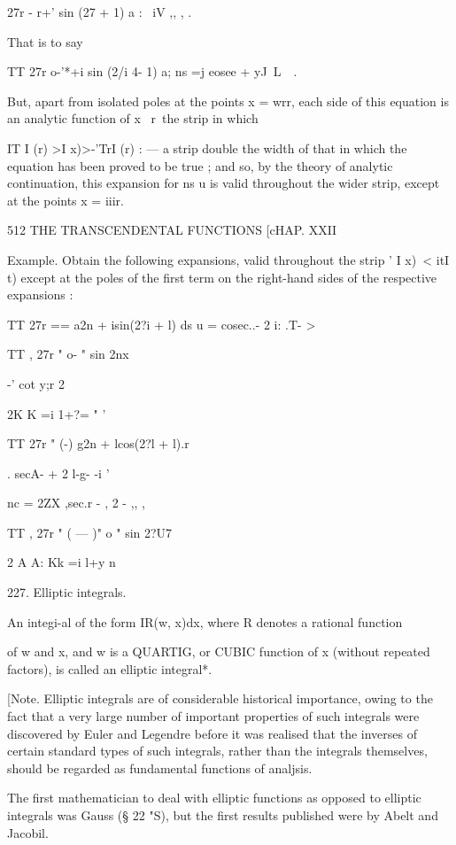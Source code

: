   27r - r+' sin (27 + 1) a : \ iV ,, , .

That is to say

TT 27r o-'*+i sin (2/i 4- 1) a; ns =j eosee + yJ\ L\ \ .

But, apart from isolated poles at the points x = wrr, each side of
this equation is an analytic function of x \ r\ the strip in which

IT I (r) >I x)>-'TrI (r) : — a strip double the width of that in which
the equation has been proved to be true ; and so, by the theory of
analytic continuation, this expansion for ns u is valid throughout the
wider strip, except at the points x = iiir.



512 THE TRANSCENDENTAL FUNCTIONS [cHAP. XXII

Example. Obtain the following expansions, valid throughout the strip '
I x)\ < itI t) except at the poles of the first term on the right-hand
sides of the respective expansions :

TT 27r == a2n + isin(2?i + l) ds u = cosec..- 2 i: .T- >

TT , 27r " o- " sin 2nx

-' cot y;r 2



2K K =i 1+?= " '

TT 27r " (-) g2n + lcos(2?l + l).r

 . secA- + 2 l-g- -i '



nc = 2ZX ,sec.r - , 2 - ,, ,

TT , 27r " ( — )" o " sin 2?U7

2 A A: Kk =i l+y n

227. Elliptic integrals.

An integi-al of the form IR(w, x)dx, where R denotes a rational
function

of w and x, and w is a QUARTIG, or CUBIC function of x (without
repeated factors), is called an elliptic integral*.

[Note. Elliptic integrals are of considerable historical importance,
owing to the fact that a very large number of important properties of
such integrals were discovered by Euler and Legendre before it was
realised that the inverses of certain standard types of such
integrals, rather than the integrals themselves, should be regarded as
fundamental functions of analjsis.

The first mathematician to deal with elliptic functions as opposed to
elliptic integrals was Gauss (§ 22 "S), but the first results
published were by Abelt and Jacobil.

